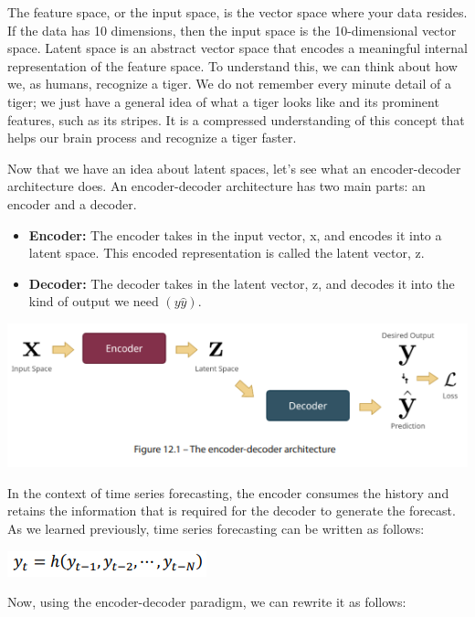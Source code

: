 \documentclass{article}
\begin{document}
The feature space, or the input space, is the vector space where your data resides. If the data has 10 dimensions, then the input space is the 10-dimensional vector space. Latent space is an abstract vector space that encodes a meaningful internal representation of the feature space. To understand this, we can think about how we, as humans, recognize a tiger. We do not remember every minute detail of a tiger; we just have a general idea of what a tiger looks like and its prominent features, such as its stripes. It is a compressed understanding of this concept that helps our brain process and recognize a tiger faster.

Now that we have an idea about latent spaces, let’s see what an encoder-decoder architecture does. An encoder-decoder architecture has two main parts: an encoder and a decoder.
\begin{itemize}
    \item \textbf{Encoder: } The encoder takes in the input vector, x, and encodes it into a latent space. This encoded representation is called the latent vector, z.
    \item \textbf{Decoder: } The decoder takes in the latent vector, z, and decodes it into the kind of output we need $(y\hat{y})$.

\end{itemize}

\begin{center}
    \includegraphics[width=.5\textwidth]{Picture1.png}
\end{center}

In the context of time series forecasting, the encoder consumes the history and retains the information that is required for the decoder to generate the forecast. As we learned previously, time series forecasting can be written as follows: 

\begin{center}
    \includegraphics[width=.5\textwidth]{Picture2.png}
\end{center}

Now, using the encoder-decoder paradigm, we can rewrite it as follows:
\end{document}
